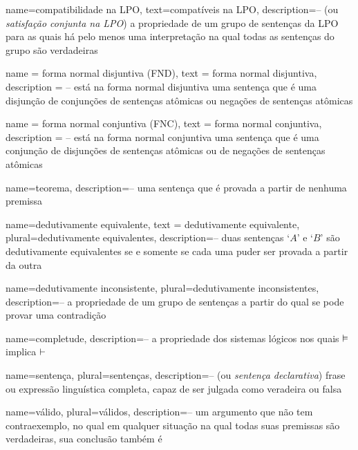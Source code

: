 {
  name=compatibilidade na LPO,
  text=compatíveis na LPO,
description={-- (ou \textit{satisfação conjunta na LPO}) a propriedade de um grupo de sentenças da LPO para as quais há pelo menos uma interpretação na qual todas as sentenças do grupo são verdadeiras}
}

{
  name = forma normal disjuntiva (FND),
  text = forma normal disjuntiva,
  description = {-- está na forma normal disjuntiva uma sentença que é uma disjunção de conjunções de sentenças atômicas ou negações de sentenças atômicas}
}

{
  name = forma normal conjuntiva (FNC),
  text = forma normal conjuntiva,
  description = {-- está na forma normal conjuntiva uma sentença que é uma conjunção de disjunções de sentenças atômicas ou de negações de sentenças atômicas}
}

  
  {
  name=teorema,
  description={-- uma sentença que é provada a partir de nenhuma premissa}
  }
  
  {
    name=dedutivamente equivalente,
    text = dedutivamente equivalente,
    plural=dedutivamente equivalentes,
  description={-- duas sentenças `$A$' e `$B$' são  dedutivamente equivalentes  se e somente se cada  uma puder ser provada a partir da outra}
  }
  
  {    name={dedutivamente inconsistente}, 
       plural={dedutivamente inconsistentes},
    description={-- a propriedade de um grupo de sentenças a partir do qual se pode provar uma contradição}
  }

  {
  name=completude,
  description={-- a propriedade dos sistemas lógicos nos quais $\vDash $ implica $\vdash$}
  }

  {
  name=sentença,
  plural=sentenças,
  description={-- (ou \textit{sentença declarativa}) frase ou expressão linguística completa, capaz de ser julgada como veradeira ou falsa}
  }
  
  {
  name=válido,
  plural=válidos,
  description={-- um argumento que não tem contraexemplo, no qual em qualquer situação na qual todas suas premissas são verdadeiras, sua conclusão também é}
  }
  
